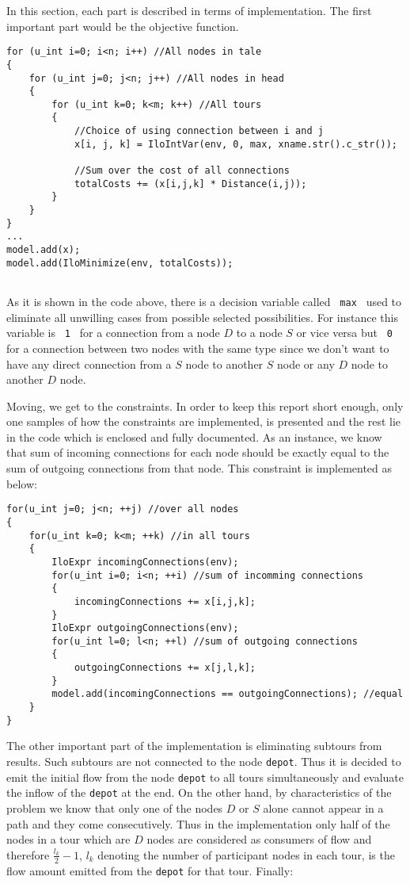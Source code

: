 In this section, each part is described in terms of implementation. The first
important part would be the objective function.

\begin{lstlisting}
for (u_int i=0; i<n; i++) //All nodes in tale
{
    for (u_int j=0; j<n; j++) //All nodes in head
    {
    	for (u_int k=0; k<m; k++) //All tours
        {
            //Choice of using connection between i and j
            x[i, j, k] = IloIntVar(env, 0, max, xname.str().c_str());
            
            //Sum over the cost of all connections
            totalCosts += (x[i,j,k] * Distance(i,j));
        }
    }
}
...
model.add(x);
model.add(IloMinimize(env, totalCosts));
     
\end{lstlisting}

As it is shown in the code above, there is a decision variable called
\texttt{ max } used to eliminate all unwilling cases from possible selected
possibilities. For instance this variable is \texttt{ 1 } for a connection from
a node $D$ to a node $S$ or vice versa but \texttt{ 0 } for a connection between
two nodes with the same type since we don't want to have any direct connection
from a $S$ node to another $S$ node or any $D$ node to another $D$ node.

Moving, we get to the constraints. In order to keep this report short enough,
only one samples of how the constraints are implemented, is presented and the
rest lie in the code which is enclosed and fully documented.
As an instance, we know that sum of incoming connections for each node should be exactly equal to the sum of outgoing connections from that
node. This constraint is implemented as below:

\begin{lstlisting}
for(u_int j=0; j<n; ++j) //over all nodes
{
    for(u_int k=0; k<m; ++k) //in all tours 
    {
        IloExpr incomingConnections(env);
        for(u_int i=0; i<n; ++i) //sum of incomming connections
        {
            incomingConnections += x[i,j,k];
        }
        IloExpr outgoingConnections(env);
        for(u_int l=0; l<n; ++l) //sum of outgoing connections
        {
            outgoingConnections += x[j,l,k];
        }
        model.add(incomingConnections == outgoingConnections); //equal
    }
}
\end{lstlisting}

The other important part of the implementation is eliminating subtours from
results. Such subtours are not connected to the node \texttt{depot}. Thus it is
decided to emit the initial flow from the node \texttt{depot} to all tours
simultaneously and evaluate the inflow of the  \texttt{depot} at the end. On the
other hand, by characteristics of the problem we know that only one of the nodes
$D$ or $S$ alone cannot appear in a path and they come consecutively. Thus in
the implementation only half of the nodes in a tour which are $D$ nodes are
considered as consumers of flow and therefore $\frac{l_k}{2}-1$, $l_k$ denoting
the number of participant nodes in each tour, is the flow amount emitted from
the \texttt{depot} for that tour.
Finally:

